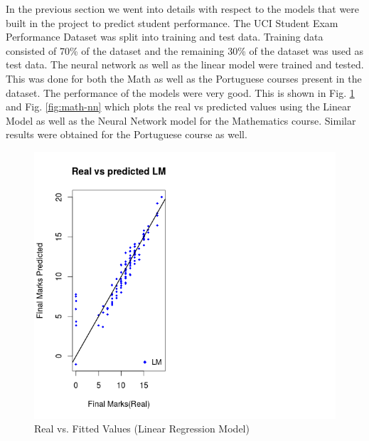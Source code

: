 \documentclass[conference]{IEEEtran}
\begin{document}
In the previous section we went into details with respect to the models that were built in the project to predict student performance. The UCI Student Exam Performance Dataset was split into training and test data. Training data consisted of 70\% of the dataset and the remaining 30\% of the dataset was used as test data. The neural network as well as the linear model were trained and tested. This was done for both the Math as well as the Portuguese courses present in the dataset. The performance of the models were very good. This is shown in Fig. \ref{fig:math-lm} and Fig. \ref{fig:math-nn} which plots the real vs predicted values using the Linear Model as well as the Neural Network model for the Mathematics course. Similar results were obtained for the Portuguese course as well.

\begin{figure}
	\includegraphics[width=\linewidth]{math_lm.png}
	\caption{Real vs. Fitted Values (Linear Regression Model)}
	\label{fig:math-lm}
\end{figure}
\end{document}
